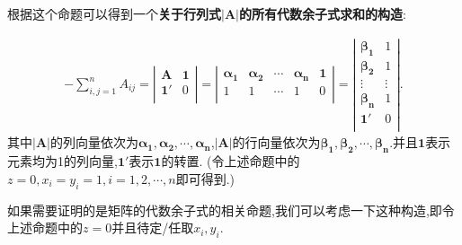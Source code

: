 \documentclass[../../main.tex]{subfiles}
\begin{document}
\begin{note}\label{关于行列式|A|所有代数余子式求和的构造}
根据这个命题可以得到一个\textbf{关于行列式$|\boldsymbol{A}|$的所有代数余子式求和的构造}:

\begin{align*}
-\sum_{i,j=1}^n{A_{ij}}=\left| \begin{matrix}
\boldsymbol{A}&		\mathbf{1}\\
\mathbf{1}'&		0\\
\end{matrix} \right|=\left| \begin{matrix}
\boldsymbol{\alpha }_{\mathbf{1}}&		\boldsymbol{\alpha }_{\mathbf{2}}&		\cdots&		\boldsymbol{\alpha }_{\boldsymbol{n}}&		\mathbf{1}\\
1&		1&		\cdots&		1&		0\\
\end{matrix} \right|=\left| \begin{matrix}
\boldsymbol{\beta }_{\mathbf{1}}&		1\\
\boldsymbol{\beta }_{\mathbf{2}}&		1\\
\vdots&		\vdots\\
\boldsymbol{\beta }_{\boldsymbol{n}}&		1\\
\mathbf{1}'&		0\\
\end{matrix} \right|.
\end{align*}
其中$|\boldsymbol{A}|$的列向量依次为$\boldsymbol{\alpha }_{\mathbf{1}},\boldsymbol{\alpha }_{\mathbf{2}},\cdots ,\boldsymbol{\alpha }_{\boldsymbol{n}}$,$|\boldsymbol{A}|$的行向量依次为$\boldsymbol{\beta }_{\mathbf{1}},\boldsymbol{\beta }_{\mathbf{2}},\cdots ,\boldsymbol{\beta }_{\boldsymbol{n}}$.并且$\mathbf{1}$表示元素均为1的列向量,$\mathbf{1}'$表示$\mathbf{1}$的转置.
(令上述命题中的$z=0,x_i=y_i=1,i=1,2,\cdots,n$即可得到.)
\end{note}
\begin{remark}
如果需要证明的是矩阵的代数余子式的相关命题,我们可以考虑一下这种构造,即令上述命题中的$z=0$并且待定/任取$x_i,y_i$.
\end{remark}
\end{document}
